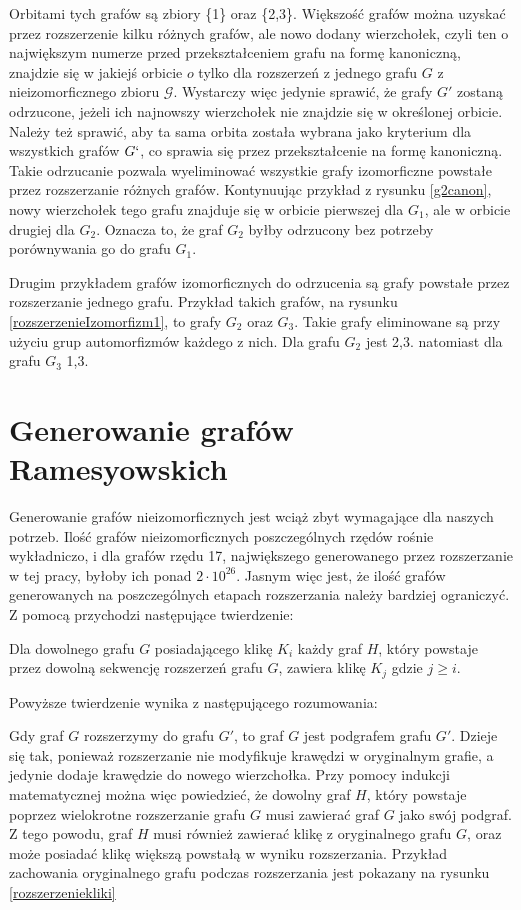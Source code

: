Orbitami tych grafów są zbiory \{1\} oraz \{2,3\}. Większość grafów można uzyskać przez rozszerzenie kilku różnych grafów, ale nowo dodany wierzchołek, czyli ten o największym numerze przed przekształceniem grafu na formę kanoniczną, znajdzie się w jakiejś orbicie $o$ tylko dla rozszerzeń z jednego grafu $G$ z nieizomorficznego zbioru $\mathcal{G}$. Wystarczy więc jedynie sprawić, że grafy $G'$ zostaną odrzucone, jeżeli ich najnowszy wierzchołek nie znajdzie się w określonej orbicie. Należy też sprawić, aby ta sama orbita została wybrana jako kryterium dla wszystkich grafów $G`$, co sprawia się przez przekształcenie na formę kanoniczną. Takie odrzucanie pozwala wyeliminować wszystkie grafy izomorficzne powstałe przez rozszerzanie różnych grafów. 
Kontynuując przykład z rysunku \ref{g2canon}, nowy wierzchołek tego grafu znajduje się w orbicie pierwszej dla $G_1$, ale w orbicie drugiej dla $G_2$. Oznacza to, że graf $G_2$ byłby odrzucony bez potrzeby porównywania go do grafu $G_1$.

Drugim przykładem grafów izomorficznych do odrzucenia są grafy powstałe przez rozszerzanie jednego grafu. Przykład takich grafów, na rysunku \ref{rozszerzenieIzomorfizm1}, to grafy $G_2$ oraz $G_3$. Takie grafy eliminowane są przy użyciu grup automorfizmów  każdego z nich. Dla grafu $G_2$ jest {2,3}. natomiast dla grafu $G_3$ {1,3}.  


\section{Generowanie grafów Ramesyowskich}

Generowanie grafów nieizomorficznych jest wciąż zbyt wymagające dla naszych potrzeb. Ilość grafów nieizomorficznych poszczególnych rzędów rośnie wykładniczo, i dla grafów rzędu 17, największego generowanego przez rozszerzanie w tej pracy, byłoby ich ponad $2 \cdot 10^{26}$\cite{OEIS}. Jasnym więc jest, że ilość grafów generowanych na poszczególnych etapach rozszerzania należy bardziej ograniczyć. Z pomocą przychodzi następujące twierdzenie: 


\begin{theorem}
	Dla dowolnego grafu $G$ posiadającego klikę $K_i$ każdy graf $H$, który powstaje przez dowolną sekwencję rozszerzeń grafu $G$, zawiera klikę $K_j$ gdzie $j \geq i$.
\label{tw5}
\end{theorem}


Powyższe twierdzenie wynika z  następującego rozumowania:

 Gdy graf $G$ rozszerzymy do grafu $G'$, to graf $G$ jest podgrafem grafu $G'$. Dzieje się tak, ponieważ rozszerzanie nie modyfikuje krawędzi w oryginalnym grafie, a jedynie dodaje krawędzie do nowego wierzchołka. Przy pomocy indukcji matematycznej można więc powiedzieć, że dowolny graf $H$, który powstaje poprzez wielokrotne rozszerzanie grafu $G$ musi zawierać graf $G$ jako swój podgraf. Z tego powodu, graf $H$ musi również zawierać klikę z oryginalnego grafu $G$, oraz może posiadać klikę większą powstałą w wyniku rozszerzania. Przykład zachowania oryginalnego grafu podczas rozszerzania jest pokazany na rysunku \ref{rozszerzeniekliki}

